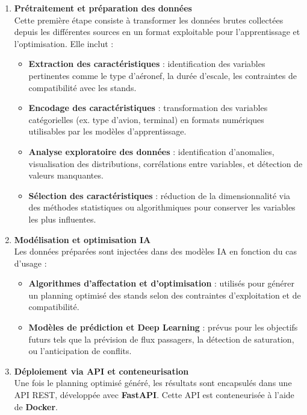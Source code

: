 \begin{enumerate}
	\item \textbf{Prétraitement et préparation des données} \\[0.3em]
	Cette première étape consiste à transformer les données brutes collectées depuis les différentes sources en un format exploitable pour l’apprentissage et l’optimisation. Elle inclut :
	\begin{itemize}
		\item \textbf{Extraction des caractéristiques} : identification des variables pertinentes comme le type d’aéronef, la durée d’escale, les contraintes de compatibilité avec les stands.
		\item \textbf{Encodage des caractéristiques} : transformation des variables catégorielles (ex. type d’avion, terminal) en formats numériques utilisables par les modèles d’apprentissage.
		\item \textbf{Analyse exploratoire des données} : identification d’anomalies, visualisation des distributions, corrélations entre variables, et détection de valeurs manquantes.
		\item \textbf{Sélection des caractéristiques} : réduction de la dimensionnalité via des méthodes statistiques ou algorithmiques pour conserver les variables les plus influentes.
	\end{itemize}
	
	\item \textbf{Modélisation et optimisation IA} \\[0.3em]
	Les données préparées sont injectées dans des modèles IA en fonction du cas d’usage :
	\begin{itemize}
		\item \textbf{Algorithmes d’affectation et d’optimisation} : utilisés pour générer un planning optimisé des stands selon des contraintes d’exploitation et de compatibilité.
		\item \textbf{Modèles de prédiction et Deep Learning} : prévus pour les objectifs futurs tels que la prévision de flux passagers, la détection de saturation, ou l’anticipation de conflits.
	\end{itemize}
	
	\item \textbf{Déploiement via API et conteneurisation} \\[0.3em]
	Une fois le planning optimisé généré, les résultats sont encapsulés dans une API REST, développée avec \textbf{FastAPI}. Cette API est conteneurisée à l’aide de \textbf{Docker}.
	

\end{enumerate}
